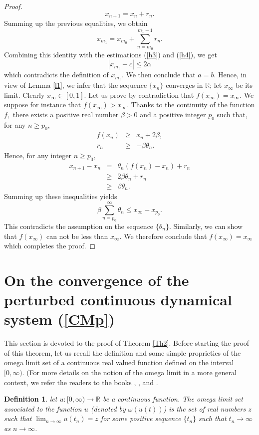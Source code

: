 \documentclass[11pt]{amsart}%
\theoremstyle{plain}
\numberwithin{equation}{section}
\newtheorem{definition}{Definition}[section]
\begin{document}
\begin{proof}
\[
x_{n+1}=x_{n}+r_{n}.
\]%
Summing up the previous equalities, we obtain%
\[
x_{m_{1}}=x_{m_{0}}+\sum_{n=m_{0}}^{m_{1}-1}r_{n}.
\]%
Combining this identity with the estimations (\ref{h3}) and (\ref{h4}), we
get
\[
\left\vert x_{m_{1}}-c\right\vert \leq 2\alpha
\]%
which contradicts the definition of $x_{m_{1}}$. We then conclude that $a=b$. Hence, in view of Lemma \ref{l1}, we infer that the sequence $\{x_{n}\}$ converges in $\mathbb{R}$; let $x_{\infty }$ be its limit.  Clearly $x_{\infty }\in [0,1].$ Let us prove by contradiction that $f(x_{\infty })=x_{\infty
}.$ We suppose for instance that $f(x_{\infty })>x_{\infty }.$ Thanks to the
continuity of the function $f,$ there exists a positive real number $\beta
>0 $ and a positive integer $p_{0}$ such that, for any $n\geq p_{0},$
\begin{eqnarray*}
f(x_{n}) &\geq &x_{n}+2\beta , \\
r_{n} &\geq &-\beta\theta _{n}.
\end{eqnarray*}%
Hence, for any integer $n\geq p_{0},$%
\begin{eqnarray*}
x_{n+1}-x_{n} &=&\theta _{n}(f(x_{n})-x_{n})+r_{n} \\
&\geq &2\beta \theta _{n}+r_{n} \\
&\geq &\beta \theta _{n}.
\end{eqnarray*}%
Summing up these inequalities yields%
$$
\beta \sum_{n=p_{0}}^{\infty }\theta _{n} \leq x_{\infty }-x_{p_{0}}.
$$
This contradicts the assumption on the sequence $\{\theta _{n}\}.$ Similarly,
we can show that $f(x_{\infty })$ can not be less than $x_{\infty }.$ We
therefore conclude that $f(x_{\infty })=x_{\infty }$ which completes the
proof.
\end{proof}
\section{On the convergence of the perturbed continuous dynamical system (\ref{CMp})}
This section is devoted to the proof of Theorem \ref{Th2}. Before starting the proof of this theorem, let us recall the definition and
some simple proprieties of the omega limit set of a continuous real valued
function defined on the interval $[0,\infty ).$ (For more details on the notion of the omega limit in a more general context, we refer the readers to the books \cite{Hal}, \cite{Har}, and \cite{JH} .
\begin{definition}
let $u:[0,\infty )\to \mathbb{R}$ be a continuous function. The
omega limit set associated to the function $u$ (denoted by $\omega (u(t))$)
is the set of real numbers $z$ such that $\lim_{n\rightarrow \infty
}u(t_{n})=z$ for some positive sequence $\{t_{n}\}$ such that $t_n\rightarrow \infty$ as $n\rightarrow \infty$.
\end{definition}
\end{document}
